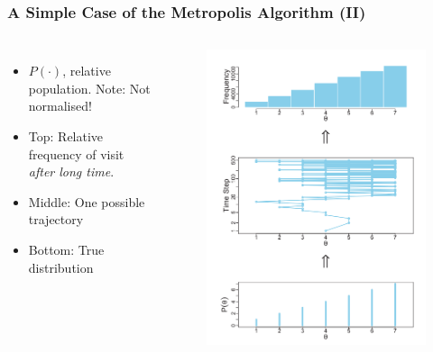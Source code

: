 \documentclass[usenames,dvipsnames,table]{beamer}
\begin{document}
\begin{frame}
\frametitle{A Simple Case of the Metropolis Algorithm (II)}
\begin{columns}[c]
\begin{itemize}
    \item $P(\cdot)$, relative population. Note: Not normalised!
    \item Top: Relative frequency of visit \emph{after long time}.
    \item Middle: One possible trajectory
    \item Bottom: True distribution
\end{itemize}
\begin{figure}
\centering
\includegraphics[height=0.8\textheight]{img/fig7_2}
\end{figure}
\end{columns}
\end{frame}
\end{document}
